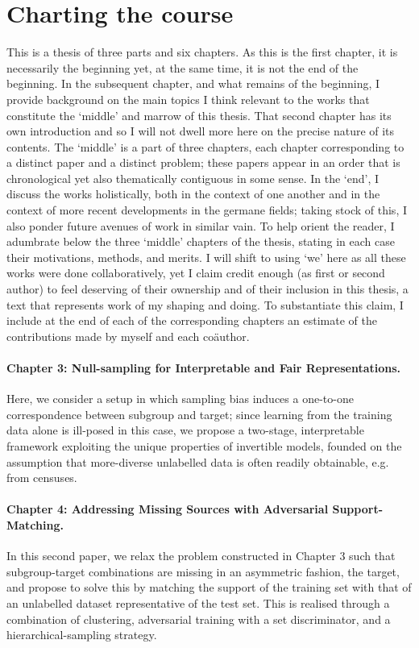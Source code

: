 \section{Charting the course}\label{sec:charting}
%
This is a thesis of three parts and six chapters. 
%
As this is the first chapter, it is necessarily the beginning yet, at the same time, it is not the
end of the beginning. 
%
In the subsequent chapter, and what remains of the beginning, I provide background on the main
topics I think relevant to the works that constitute the `middle' and marrow of this thesis.
%
That second chapter has its own introduction and so I will not dwell more here on the precise
nature of its contents.
%
The `middle' is a part of three chapters, each chapter corresponding to a distinct paper and a
distinct problem; these papers appear in an order that is chronological yet also thematically
contiguous in some sense.
%
In the `end', I discuss the works holistically, both in the context of one another and in the
context of more recent developments in the germane fields; taking stock of this, I also ponder
future avenues of work in similar vain.
%
To help orient the reader, I adumbrate below the three `middle' chapters of the thesis, stating
in each case their motivations, methods, and merits. 
%
I will shift to using `we' here as all these works were done collaboratively, yet I claim credit
enough (as first or second author) to feel deserving of their ownership and of their inclusion in
this thesis, a text that represents work of my shaping and doing.
%
To substantiate this claim, I include at the end of each of the corresponding chapters an estimate
of the contributions made by myself and each co{\"a}uthor.

\paragraph{Chapter 3: Null-sampling for Interpretable and Fair Representations.}
%
Here, we consider a setup in which sampling bias induces a one-to-one correspondence between
subgroup and target; since learning from the training data alone is ill-posed in this case, we
propose a two-stage, interpretable framework exploiting the unique properties of invertible models,
founded on the assumption that more-diverse unlabelled data is often readily obtainable, e.g. from
censuses.

\paragraph{Chapter 4: Addressing Missing Sources with Adversarial Support-Matching.}
%
In this second paper, we relax the problem constructed in Chapter 3 such that subgroup-target
combinations are missing in an asymmetric fashion, \wrt{} the target, and propose to solve this by
matching the support of the training set with that of an unlabelled dataset representative of the
test set. 
%
This is realised through a combination of clustering, adversarial training with a set
discriminator, and a hierarchical-sampling strategy.
%

